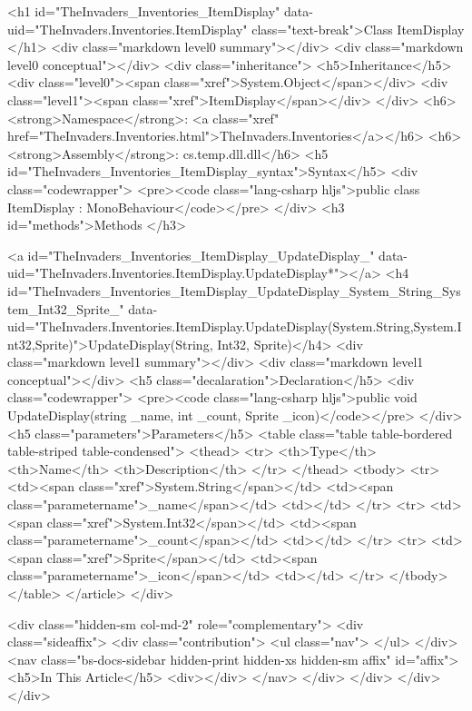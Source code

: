   
  <h1 id="TheInvaders_Inventories_ItemDisplay" data-uid="TheInvaders.Inventories.ItemDisplay" class="text-break">Class ItemDisplay
  </h1>
  <div class="markdown level0 summary"></div>
  <div class="markdown level0 conceptual"></div>
  <div class="inheritance">
    <h5>Inheritance</h5>
    <div class="level0"><span class="xref">System.Object</span></div>
    <div class="level1"><span class="xref">ItemDisplay</span></div>
  </div>
  <h6><strong>Namespace</strong>: <a class="xref" href="TheInvaders.Inventories.html">TheInvaders.Inventories</a></h6>
  <h6><strong>Assembly</strong>: cs.temp.dll.dll</h6>
  <h5 id="TheInvaders_Inventories_ItemDisplay_syntax">Syntax</h5>
  <div class="codewrapper">
    <pre><code class="lang-csharp hljs">public class ItemDisplay : MonoBehaviour</code></pre>
  </div>
  <h3 id="methods">Methods
  </h3>
  
  
  <a id="TheInvaders_Inventories_ItemDisplay_UpdateDisplay_" data-uid="TheInvaders.Inventories.ItemDisplay.UpdateDisplay*"></a>
  <h4 id="TheInvaders_Inventories_ItemDisplay_UpdateDisplay_System_String_System_Int32_Sprite_" data-uid="TheInvaders.Inventories.ItemDisplay.UpdateDisplay(System.String,System.Int32,Sprite)">UpdateDisplay(String, Int32, Sprite)</h4>
  <div class="markdown level1 summary"></div>
  <div class="markdown level1 conceptual"></div>
  <h5 class="decalaration">Declaration</h5>
  <div class="codewrapper">
    <pre><code class="lang-csharp hljs">public void UpdateDisplay(string _name, int _count, Sprite _icon)</code></pre>
  </div>
  <h5 class="parameters">Parameters</h5>
  <table class="table table-bordered table-striped table-condensed">
    <thead>
      <tr>
        <th>Type</th>
        <th>Name</th>
        <th>Description</th>
      </tr>
    </thead>
    <tbody>
      <tr>
        <td><span class="xref">System.String</span></td>
        <td><span class="parametername">_name</span></td>
        <td></td>
      </tr>
      <tr>
        <td><span class="xref">System.Int32</span></td>
        <td><span class="parametername">_count</span></td>
        <td></td>
      </tr>
      <tr>
        <td><span class="xref">Sprite</span></td>
        <td><span class="parametername">_icon</span></td>
        <td></td>
      </tr>
    </tbody>
  </table>
</article>
          </div>
          
          <div class="hidden-sm col-md-2" role="complementary">
            <div class="sideaffix">
              <div class="contribution">
                <ul class="nav">
                </ul>
              </div>
              <nav class="bs-docs-sidebar hidden-print hidden-xs hidden-sm affix" id="affix">
                <h5>In This Article</h5>
                <div></div>
              </nav>
            </div>
          </div>
        </div>
      </div>
      
